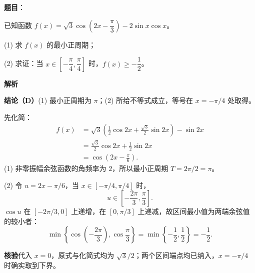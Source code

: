 \begin{answer}

\textbf{题目}：

已知函数 $f(x)=\sqrt3\cos\left(2x-\dfrac\pi3\right)-2\sin x\cos x$。

(1)   求 $f(x)$ 的最小正周期；

(2)   求证：当 $x\in\left[-\dfrac\pi4,\dfrac\pi4\right]$ 时，$f(x)\geqslant-\dfrac12$。

\textbf{解析}

\textbf{结论（D）}(1) 最小正周期为 $\pi$；(2) 所给不等式成立，等号在 $x=-\pi/4$ 处取得。

先化简：
\nopagebreak[4]
\[
\begin{aligned}
f(x)
&=\sqrt3\left(\frac12\cos2x+\frac{\sqrt3}{2}\sin2x\right)-\sin2x\\
&=\frac{\sqrt3}{2}\cos2x+\frac12\sin2x\\
&=\cos\left(2x-\frac\pi6\right).
\end{aligned}
\]
(1) 非零振幅余弦函数的角频率为 $2$，所以最小正周期 $T=2\pi/2=\pi$。

(2) 令 $u=2x-\pi/6$，当 $x\in[-\pi/4,\pi/4]$ 时，
\nopagebreak[4]
\[
u\in\left[-\frac{2\pi}3,\frac\pi3\right].
\]
$\cos u$ 在 $[-2\pi/3,0]$ 上递增，在 $[0,\pi/3]$ 上递减，故区间最小值为两端余弦值的较小者：
\nopagebreak[4]
\[
\min\left\{\cos\left(-\frac{2\pi}3\right),\cos\frac\pi3\right\}
=\min\left\{-\frac12,\frac12\right\}=-\frac12.
\]

\textbf{核验}代入 $x=0$，原式与化简式均为 $\sqrt3/2$；两个区间端点均已纳入，$x=-\pi/4$ 时确实取到下界。



\end{answer}
